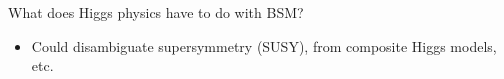 \begin{frame}
\begin{block}{What does Higgs physics have to do with BSM?}
\begin{itemize}
			\begin{itemize}
				\item Could disambiguate supersymmetry (SUSY), from composite Higgs models, etc.
			\end{itemize}
		\end{itemize}
	\end{block}
\end{frame}


